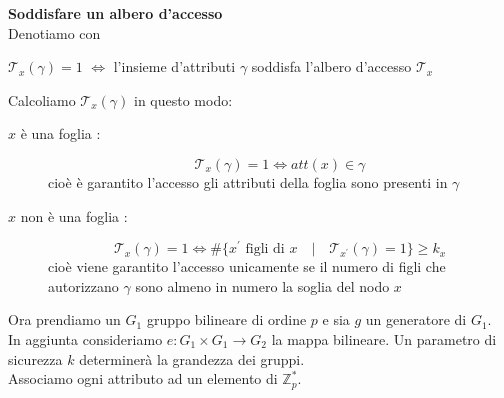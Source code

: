 \textbf{Soddisfare un albero d'accesso}\\
Denotiamo con 
\begin{center}
$\mathcal{T}_x(\gamma) = 1$ $\Leftrightarrow$ l'insieme d'attributi $\gamma$ soddisfa l'albero d'accesso $\mathcal{T}_x$
\end{center}
Calcoliamo $\mathcal{T}_x(\gamma)$ in questo modo:
\begin{description}
\item[$x$ è una foglia :] \[\mathcal{T}_x(\gamma) = 1 \Leftrightarrow att(x) \in \gamma\]
cioè è garantito l'accesso gli attributi della foglia sono presenti in $\gamma$
\item[$x$ non è una foglia :] \[\mathcal{T}_x(\gamma) = 1  \Leftrightarrow \# \{x^\prime \text{ figli di } x \quad|\quad \mathcal{T}_{x^\prime}(\gamma) = 1  \} \geq k_x\]
cioè viene garantito l'accesso unicamente se il numero di figli che autorizzano $\gamma$ sono almeno in numero la soglia del nodo $x$ 
\end{description}

Ora prendiamo un $G_1$ gruppo bilineare di ordine $p$ e sia $g$ un generatore di $G_1$.\\
In aggiunta consideriamo $e : G_1 \times G_1 \rightarrow G_2$ la mappa bilineare. Un parametro di sicurezza $k$ determinerà la grandezza dei gruppi.\\
Associamo ogni attributo ad un elemento di $\mathbb{Z}_p^*$.\\

